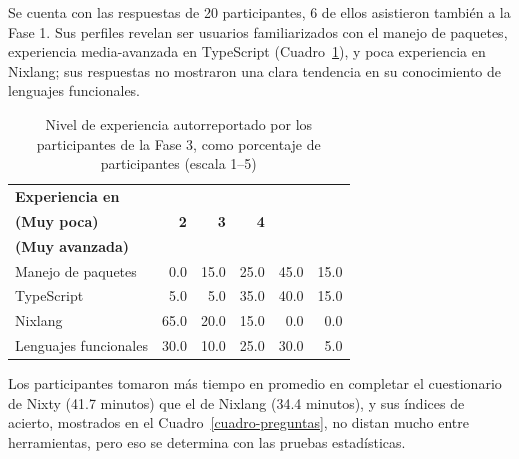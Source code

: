 Se cuenta con las respuestas de 20 participantes, 6 de ellos asistieron también a la Fase 1. Sus perfiles revelan ser usuarios familiarizados con el manejo de paquetes, experiencia media-avanzada en TypeScript (Cuadro~\ref{cuadro-experiencia}), y poca experiencia en Nixlang; sus respuestas no mostraron una clara tendencia en su conocimiento de lenguajes funcionales.

\begin{table}[htbp]
\centering
\setlength{\tabcolsep}{4pt}
\begin{tabular}{|l|r|r|r|r|r|}
\hline
\textbf{Experiencia en} & \makecell[r]{\textbf{1} \\ \textbf{(Muy poca)}} & \textbf{2} & \textbf{3} & \textbf{4} & \makecell[r]{\textbf{5} \\ \textbf{(Muy avanzada)}} \\
\hline
Manejo de paquetes & 0.0 & 15.0 & 25.0 & 45.0 & 15.0 \\
\hline
TypeScript & 5.0 & 5.0 & 35.0 & 40.0 & 15.0 \\
\hline
Nixlang & 65.0 & 20.0 & 15.0 & 0.0 & 0.0 \\
\hline
Lenguajes funcionales & 30.0 & 10.0 & 25.0 & 30.0 & 5.0 \\
\hline
\end{tabular}
\caption{Nivel de experiencia autorreportado por los participantes de la Fase 3, como porcentaje de participantes (escala 1--5)}
\label{cuadro-experiencia}
\end{table}

Los participantes tomaron más tiempo en promedio en completar el cuestionario de Nixty (41.7 minutos) que el de Nixlang (34.4 minutos), y sus índices de acierto, mostrados en el Cuadro~\ref{cuadro-preguntas}, no distan mucho entre herramientas, pero eso se determina con las pruebas estadísticas.

